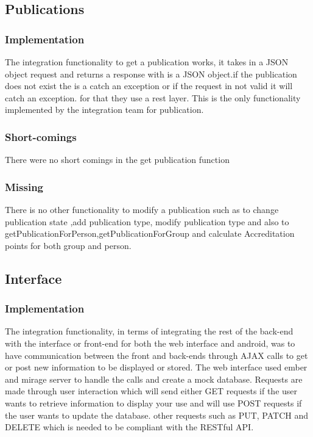 \documentclass{article}
\begin{document}
    \subsection{Publications}
        \subsubsection{Implementation}
            The integration functionality to get a publication works, it takes in a JSON object request and returns a response with is a JSON object.if the publication does not exist the is a catch an exception or if the request in not valid it will catch an exception. for that they use a rest layer. This is the only functionality implemented by the integration team for publication.
        \subsubsection{Short-comings}
        There were no short comings in the get publication function
        \subsubsection{Missing}
        There is no other functionality to modify a publication such as to change publication state ,add publication type, modify publication type and also to getPublicationForPerson,getPublicationForGroup and calculate Accreditation points for both group and person.
        
    \subsection{Interface}
        \subsubsection{Implementation}
        The integration functionality, in terms of integrating the rest of the back-end with the interface or front-end for both the web interface and android, was to have communication between the front and back-ends through AJAX calls to get or post new information to be displayed or stored. The web interface used ember and mirage server to handle the calls and create a mock database. Requests are made through user interaction which will send either GET requests if the user wants to retrieve information to display your use and will use POST requests if the user wants to update the database. other requests such as PUT, PATCH and DELETE which is needed to be compliant with the RESTful API.
\end{document}
